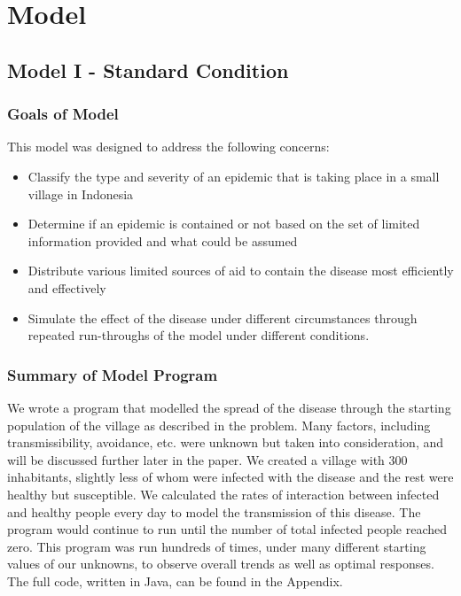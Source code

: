 \documentclass[12pt]{article}
\begin{document}
\newpage
\section{Model}

\subsection{Model I - Standard Condition}

\subsubsection{Goals of Model}

This model was designed to address the following concerns:
\begin{itemize}
	\item Classify the type and severity of an epidemic that is taking place in a small village in Indonesia
	\item Determine if an epidemic is contained or not based on the set of limited information provided and what could be assumed
	\item Distribute various limited sources of aid to contain the disease most efficiently and effectively
	\item Simulate the effect of the disease under different circumstances through repeated run-throughs of the model under different conditions.
\end{itemize}

\subsubsection{Summary of Model Program}

We wrote a program that modelled the spread of the disease through the starting population of the village as described in the problem. Many factors, including transmissibility, avoidance, etc. were unknown but taken into consideration, and will be discussed further later in the paper. We created a village with 300 inhabitants, slightly less of whom were infected with the disease and the rest were healthy but susceptible. We calculated the rates of interaction between infected and healthy people every day to model the transmission of this disease. The program would continue to run until the number of total infected people reached zero. This program was run hundreds of times, under many different starting values of our unknowns, to observe overall trends as well as optimal responses. The full code, written in Java, can be found in the Appendix.
\end{document}
